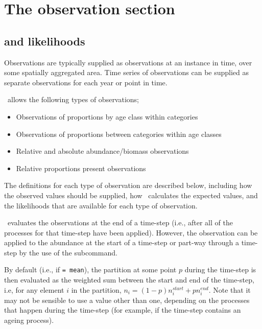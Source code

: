 \section{The observation section\label{sec:observation-section}}

\subsection{ and likelihoods\label{sec:likelihoods}}

Observations are typically supplied as observations at an instance in time, over some spatially aggregated area. Time series of observations can be supplied as separate observations for each year or point in time. 

\SPM\ allows the following types of observations;
\begin{itemize}
  \item Observations of proportions by age class within categories
  \item Observations of proportions between categories within age classes
  \item Relative and absolute abundance/biomass observations
  \item Relative proportions present observations
	
\end{itemize}

The definitions for each type of observation are described below, including how the observed values should be supplied, how \SPM\ calculates the expected values, and the likelihoods that are available for each type of observation.

\SPM\ evaluates the observations at the end of a time-step (i.e., after all of the processes for that time-step have been applied). However, the observation can be applied to the abundance at the start of a time-step or part-way through a time-step by the use of the  subcommand. 

By default (i.e., if  \texttt{= mean}), the partition at some point $p$ during the time-step is then evaluated as the weighted sum between the start and end of the time-step, i.e, for any element $i$ in the partition, $n_i=(1-p) n_i^{start} + p n_i^{end}$. Note that it may not be sensible to use a value other than one, depending on the processes that happen during the time-step (for example, if the time-step contains an ageing process).

